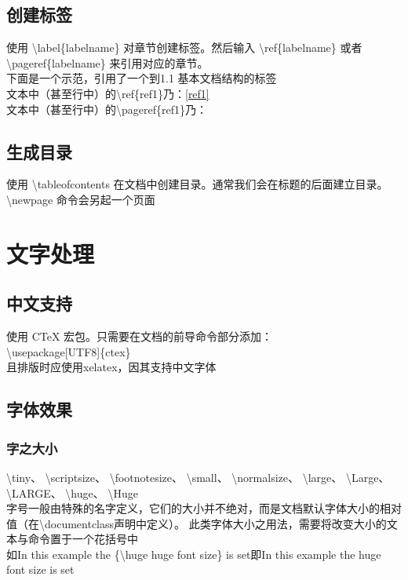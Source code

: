 \documentclass{article}
\begin{document}
\subsection{创建标签}
使用 \textbackslash label\{labelname\} 对章节创建标签。然后输入 \textbackslash ref\{labelname\} 或者 \textbackslash pageref\{labelname\} 来引用对应的章节。\\

下面是一个示范，引用了一个到1.1 基本文档结构的标签\\
文本中（甚至行中）的\textbackslash ref\{ref1\}乃：\ref{ref1}  \\
文本中（甚至行中）的\textbackslash pageref\{ref1\}乃：\pageref{ref1}
\subsection{生成目录}
使用 \textbackslash tableofcontents 在文档中创建目录。通常我们会在标题的后面建立目录。\\
\textbackslash newpage 命令会另起一个页面
\section{文字处理}
\subsection{中文支持}
使用 CTeX 宏包。只需要在文档的前导命令部分添加：\\
\textbackslash usepackage[UTF8]\{ctex\}\\	
且排版时应使用xelatex，因其支持中文字体	

\subsection{字体效果}
\subsubsection{字之大小}
\textbackslash tiny、
\textbackslash scriptsize、
\textbackslash footnotesize、
\textbackslash small、
\textbackslash normalsize、
\textbackslash large、
\textbackslash Large、
\textbackslash LARGE、
\textbackslash huge、
\textbackslash Huge\\
字号一般由特殊的名字定义，它们的大小并不绝对，而是文档默认字体大小的相对值（在\textbackslash documentclass声明中定义）。
此类字体大小之用法，需要将改变大小的文本与命令置于一个花括号中\\
{如In this example the \{\textbackslash huge huge font size\} is set即In this example the {\huge huge font size} is set}
\end{document}
